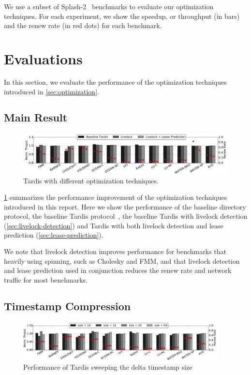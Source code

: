\documentclass[12pt]{article}
\newcommand{\red}[1]{\textcolor{red}{#1}}
\begin{document}
We use a subset of Splash-2~\cite{splash2} benchmarks to evaluate our 
optimization techniques. For each experiment, we show the speedup, or 
throughput (in bars) and the renew rate (in red dots) for each 
benchmark.

\section{Evaluations}

In this section, we evaluate the performance of the optimization 
techniques introduced in \cref{sec:optimization}.

\subsection{Main Result}

\begin{figure}
	\centering
	\includegraphics[width=0.95\columnwidth]{figs/main.pdf}
	\caption{ Tardis with different optimization techniques.}
	\label{fig:main}
\end{figure}

\cref{fig:main} summarizes the performance improvement of the 
optimization techniques introduced in this report. Here we show the 
performance of the baseline directory protocol, the baseline Tardis protocol~\cite{tardis}, the baseline Tardis with livelock 
detection (\cref{sec:livelock-detection}) and Tardis with both livelock 
detection and lease prediction (\cref{sec:lease-prediction}).


We note that livelock detection improves performance for benchmarks that heavily using spinning, such as Cholesky and FMM, and that livelock detection and lease prediction used in conjunction reduces the renew rate and network traffic for most benchmarks.

\subsection{Timestamp Compression}

\begin{figure}
	\centering
	\includegraphics[width=0.95\textwidth]{figs/tssize.pdf}
	\caption{ Performance of Tardis sweeping the delta timestamp size}
	\label{fig:tssize}
\end{figure}
\end{document}

